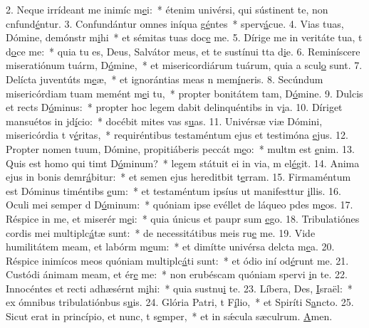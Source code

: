 2. Neque irrídeant me inimíc m\uline{e}i:~* étenim univérsi, qui sústinent te, non cnfund\uline{é}ntur.
3. Confundántur omnes iníqua g\uline{é}ntes~* sperv\uline{á}cue.
4. Vias tuas, Dómine, demónstr m\uline{i}hi~* et sémitas tuas doc\uline{e} me.
5. Dírige me in veritáte tua, t d\uline{o}ce me:~* quia tu es, Deus, Salvátor meus, et te sustínui tta d\uline{i}e.
6. Reminíscere miseratiónum tuárm, D\uline{ó}mine,~* et misericordiárum tuárum, quia a scul\uline{o} sunt.
7. Delícta juventúts m\uline{e}æ,~* et ignorántias meas n mem\uline{í}neris.
8. Secúndum misericórdiam tuam memént m\uline{e}i tu,~* propter bonitátem tam, D\uline{ó}mine.
9. Dulcis et rects D\uline{ó}minus:~* propter hoc legem dabit delinquéntibs in v\uline{i}a.
10. Díriget mansuétos in jd\uline{í}cio:~* docébit mites vas s\uline{u}as.
11. Univérsæ viæ Dómini, misericórdia t v\uline{é}ritas,~* requiréntibus testaméntum ejus et testimóna \uline{e}jus.
12. Propter nomen tuum, Dómine, propitiáberis peccát m\uline{e}o:~* multm est \uline{e}nim.
13. Quis est homo qui timt D\uline{ó}minum?~* legem státuit ei in via, m el\uline{é}git.
14. Anima ejus in bonis demr\uline{á}bitur:~* et semen ejus hereditbit t\uline{e}rram.
15. Firmaméntum est Dóminus timéntibs \uline{e}um:~* et testaméntum ipsíus ut manifesttur \uline{i}llis.
16. Oculi mei semper d D\uline{ó}minum:~* quóniam ipse evéllet de láqueo pdes m\uline{e}os.
17. Réspice in me, et miserér m\uline{e}i:~* quia únicus et paupr sum \uline{e}go.
18. Tribulatiónes cordis mei multiplc\uline{á}tæ sunt:~* de necessitátibus meis ru\uline{e} me.
19. Vide humilitátem meam, et labórm m\uline{e}um:~* et dimítte univérsa delcta m\uline{e}a.
20. Réspice inimícos meos quóniam multiplc\uline{á}ti sunt:~* et ódio iní od\uline{é}runt me.
21. Custódi ánimam meam, et ér\uline{e} me:~* non erubéscam quóniam spervi \uline{i}n te.
22. Innocéntes et recti adhæsérnt m\uline{i}hi:~* quia sustnu\uline{i} te.
23. Líbera, Des, \uline{I}sraël:~* ex ómnibus tribulatiónbus s\uline{u}is.
24. Glória Patri, t F\uline{í}lio,~* et Spiríti S\uline{a}ncto.
25. Sicut erat in princípio, et nunc, t s\uline{e}mper,~* et in sǽcula sæculrum. \uline{A}men.
